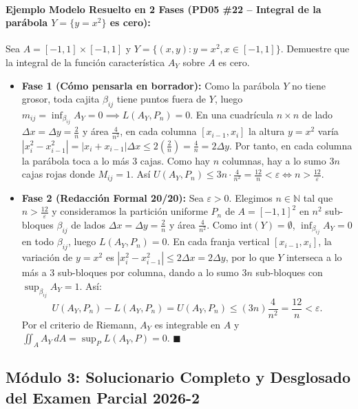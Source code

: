 \documentclass[11pt,a4paper]{article}
\begin{document}
\paragraph{Ejemplo Modelo Resuelto en 2 Fases (PD05 \#22 -- Integral de la parábola $Y = \{y=x^2\}$ es cero):}
Sea $A = [-1,1]\times[-1,1]$ y $Y = \{(x,y) : y = x^2, x \in [-1,1]\}$. Demuestre que la integral de la función característica $A_Y$ sobre $A$ es cero.
\begin{itemize}[leftmargin=1.5em]
  \item \textbf{Fase 1 (Cómo pensarla en borrador):} Como la parábola $Y$ no tiene grosor, toda cajita $\beta_{ij}$ tiene puntos fuera de $Y$, luego $m_{ij} = \inf_{\beta_{ij}} A_Y = 0 \implies L(A_Y, P_n) = 0$. En una cuadrícula $n\times n$ de lado $\Delta x = \Delta y = \frac{2}{n}$ y área $\frac{4}{n^2}$, en cada columna $[x_{i-1},x_i]$ la altura $y=x^2$ varía $|x_i^2 - x_{i-1}^2| = |x_i+x_{i-1}|\Delta x \le 2(\frac{2}{n}) = \frac{4}{n} = 2\Delta y$. Por tanto, en cada columna la parábola toca a lo más $3$ cajas. Como hay $n$ columnas, hay a lo sumo $3n$ cajas rojas donde $M_{ij}=1$. Así $U(A_Y,P_n) \le 3n \cdot \frac{4}{n^2} = \frac{12}{n} < \varepsilon \iff n > \frac{12}{\varepsilon}$.
  \item \textbf{Fase 2 (Redacción Formal 20/20):} Sea $\varepsilon > 0$. Elegimos $n \in \mathbb{N}$ tal que $n > \frac{12}{\varepsilon}$ y consideramos la partición uniforme $P_n$ de $A=[-1,1]^2$ en $n^2$ sub-bloques $\beta_{ij}$ de lados $\Delta x = \Delta y = \frac{2}{n}$ y área $\frac{4}{n^2}$. Como $\text{int}(Y) = \emptyset$, $\inf_{\beta_{ij}} A_Y = 0$ en todo $\beta_{ij}$, luego $L(A_Y,P_n)=0$. En cada franja vertical $[x_{i-1},x_i]$, la variación de $y=x^2$ es $|x_i^2-x_{i-1}^2| \le 2\Delta x = 2\Delta y$, por lo que $Y$ interseca a lo más a $3$ sub-bloques por columna, dando a lo sumo $3n$ sub-bloques con $\sup_{\beta_{ij}} A_Y = 1$. Así:
  \[ U(A_Y, P_n) - L(A_Y, P_n) = U(A_Y, P_n) \le (3n)\frac{4}{n^2} = \frac{12}{n} < \varepsilon. \]
  Por el criterio de Riemann, $A_Y$ es integrable en $A$ y $\iint_A A_Y\,dA = \sup_P L(A_Y,P) = 0$. $\blacksquare$
\end{itemize}

\newpage
\subsection{Módulo 3: Solucionario Completo y Desglosado del Examen Parcial 2026-2}
\end{document}
